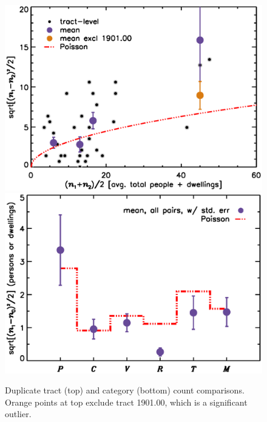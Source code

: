 \documentclass[11pt,twocolumn]{article}
\begin{document}
%
%

\begin{figure}[t]
\centering
	\includegraphics[width=\linewidth]{intDupeChar}\\
	\includegraphics[width=\linewidth]{catDupeChar}
\caption{Duplicate tract (top) and category (bottom) count comparisons. Orange 
		points at top exclude tract 1901.00, which is a significant outlier.}
\label{fig:dupeChar}
\end{figure}
\end{document}
